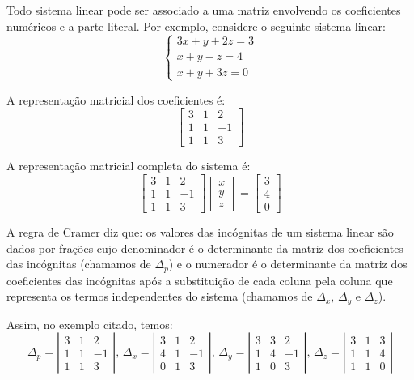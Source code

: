 \documentclass[12pt,a4paper]{article}
\begin{document}
Todo sistema linear pode ser associado a uma matriz envolvendo os coeficientes numéricos e a parte literal. Por exemplo, considere o seguinte sistema linear: $$\begin{cases}3x+y+2z = 3 \\ x+y-z = 4 \\ x+ y+3z= 0 \end{cases}$$

A representação matricial dos coeficientes é: $$\left[\begin{matrix}3 & 1 & 2 \\ 1 & 1 & -1 \\ 1 & 1 & 3 \end{matrix}\right]$$

A representação matricial completa do sistema é: $$\left[\begin{matrix}3 & 1 & 2 \\ 1 & 1 & -1 \\ 1 & 1 & 3 \end{matrix}\right] \left[\begin{matrix}x \\ y \\ z \end{matrix} \right] = \left[ \begin{matrix}3 \\ 4 \\ 0 \end{matrix} \right]$$

A regra de Cramer diz que: os valores das incógnitas de um sistema linear são dados por frações cujo denominador é o determinante da matriz dos coeficientes das incógnitas (chamamos de $\Delta _p$) e o numerador é o determinante da matriz dos coeficientes das incógnitas após a substituição de cada coluna pela coluna que representa os termos independentes do sistema (chamamos de $\Delta _x,\, \Delta _y $ e $\Delta_z$).

Assim, no exemplo citado, temos: $$\Delta_p = \left| \begin{matrix}3 & 1 & 2 \\ 1 & 1 & -1 \\ 1 & 1 & 3 \end{matrix}\right|,\, \Delta_x = \left| \begin{matrix}3 & 1 & 2 \\ 4 & 1 & -1 \\ 0 & 1 & 3 \end{matrix}\right|,\,\Delta_y = \left| \begin{matrix}3 & 3 & 2 \\ 1 & 4 & -1 \\ 1 & 0 & 3 \end{matrix}\right|,\,\Delta_z = \left| \begin{matrix}3 & 1 & 3 \\ 1 & 1 & 4 \\ 1 & 1 & 0 \end{matrix}\right| $$
\end{document}
